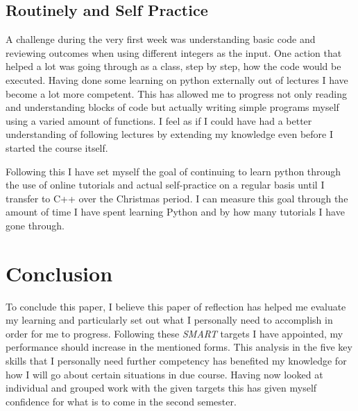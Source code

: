 \documentclass{scrartcl}
\begin{document}
\subsection{Routinely and Self Practice}
A challenge during the very first week was understanding basic code and reviewing outcomes when using different integers as the input. One action that helped a lot was going through as a class, step by step, how the code would be executed. Having done some learning on python externally out of lectures I have become a lot more competent. This has allowed me to progress not only reading and understanding blocks of code but actually writing simple programs myself using a varied amount of functions. I feel as if I could have had a better understanding of following lectures by extending my knowledge even before I started the course itself.

Following this I have set myself the goal of continuing to learn python through the use of online tutorials and actual self-practice on a regular basis until I transfer to C++ over the Christmas period. I can measure this goal through the amount of time I have spent learning Python and by how many tutorials I have gone through.

\section{Conclusion}

To conclude this paper, I believe this paper of reflection has helped me evaluate my learning and particularly set out what I personally need to accomplish in order for me to progress. Following these \textit{SMART} targets I have appointed, my performance should increase in the mentioned forms.
This analysis in the five key skills that I personally need further competency has benefited my knowledge for how I will go about certain situations in due course. Having now looked at individual and grouped work with the given targets this has given myself confidence for what is to come in the second semester.





\end{document}
